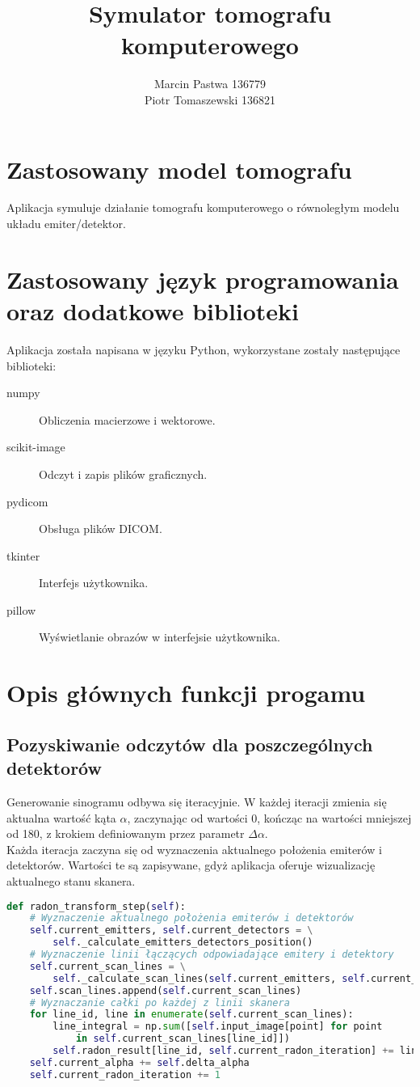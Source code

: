\documentclass[a4paper]{article}
\title{Symulator tomografu komputerowego}
\author{Marcin Pastwa 136779\\
Piotr Tomaszewski 136821 }
\date{}
\begin{document}
\maketitle
\section{Zastosowany model tomografu}
Aplikacja symuluje działanie tomografu komputerowego o równoległym modelu układu emiter/detektor.

\section{Zastosowany język programowania oraz dodatkowe biblioteki}
Aplikacja została napisana w języku Python, wykorzystane zostały następujące biblioteki:
\begin{description}
    \item [numpy] Obliczenia macierzowe i wektorowe.
    \item [scikit-image] Odczyt i zapis plików graficznych.
    \item [pydicom] Obsługa plików DICOM.
    \item [tkinter] Interfejs użytkownika.
    \item [pillow] Wyświetlanie obrazów w interfejsie użytkownika.
\end{description}

\section{Opis głównych funkcji progamu}
\subsection{Pozyskiwanie odczytów dla poszczególnych detektorów}
Generowanie sinogramu odbywa się iteracyjnie. W każdej iteracji zmienia się aktualna wartość kąta $\alpha$, zaczynając od wartości 0\degree, kończąc na wartości mniejszej od 180\degree, z krokiem definiowanym przez parametr $\Delta\alpha$. \\
Każda iteracja zaczyna się od wyznaczenia aktualnego położenia emiterów i detektorów. Wartości te są zapisywane, gdyż aplikacja oferuje wizualizację aktualnego stanu skanera.
\begin{lstlisting}[language=Python, caption=Krok transformaty Radona, texcl=true]
def radon_transform_step(self):
    # Wyznaczenie aktualnego położenia emiterów i detektorów
    self.current_emitters, self.current_detectors = \
        self._calculate_emitters_detectors_position()
    # Wyznaczenie linii łączących odpowiadające emitery i detektory
    self.current_scan_lines = \
        self._calculate_scan_lines(self.current_emitters, self.current_detectors)
    self.scan_lines.append(self.current_scan_lines)
    # Wyznaczanie całki po każdej z linii skanera
    for line_id, line in enumerate(self.current_scan_lines):
        line_integral = np.sum([self.input_image[point] for point 
            in self.current_scan_lines[line_id]])
        self.radon_result[line_id, self.current_radon_iteration] += line_integral
    self.current_alpha += self.delta_alpha
    self.current_radon_iteration += 1
\end{lstlisting}
\end{document}
